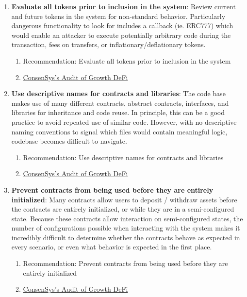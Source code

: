 \begin{enumerate}
\item\textbf{Evaluate all tokens prior to inclusion in the system}: Review current and future tokens in the system for non-standard behavior. Particularly dangerous functionality to look for includes a callback (ie. ERC777) which would enable an attacker to execute potentially arbitrary code during the transaction, fees on transfers, or inflationary/deflationary tokens.
	\begin{enumerate}
	\item Recommendation: Evaluate all tokens prior to inclusion in the system
	\item\href{https://consensys.net/diligence/audits/2020/12/growth-defi-v1/\#evaluate-all-tokens-prior-to-inclusion-in-the-system}{ConsenSys's Audit of Growth DeFi}
	\end{enumerate}

\item\textbf{Use descriptive names for contracts and libraries}: The code base makes use of many different contracts, abstract contracts, interfaces, and libraries for inheritance and code reuse. In principle, this can be a good practice to avoid repeated use of similar code. However, with no descriptive naming conventions to signal which files would contain meaningful logic, codebase becomes difficult to navigate.
	\begin{enumerate}
	\item Recommendation: Use descriptive names for contracts and libraries
	\item\href{https://consensys.net/diligence/audits/2020/12/growth-defi-v1/\#use-descriptive-names-for-contracts-and-libraries}{ConsenSys's Audit of Growth DeFi}
	\end{enumerate}

\item\textbf{Prevent contracts from being used before they are entirely initialized}: Many contracts allow users to deposit / withdraw assets before the contracts are entirely initialized, or while they are in a semi-configured state. Because these contracts allow interaction on semi-configured states, the number of configurations possible when interacting with the system makes it incredibly difficult to determine whether the contracts behave as expected in every scenario, or even what behavior is expected in the first place.
	\begin{enumerate}
	\item Recommendation: Prevent contracts from being used before they are entirely initialized
	\item\href{https://consensys.net/diligence/audits/2020/12/growth-defi-v1/\#prevent-contracts-from-being-used-before-they-are-entirely-initialized}{ConsenSys's Audit of Growth DeFi}
	\end{enumerate}


\end{enumerate}
